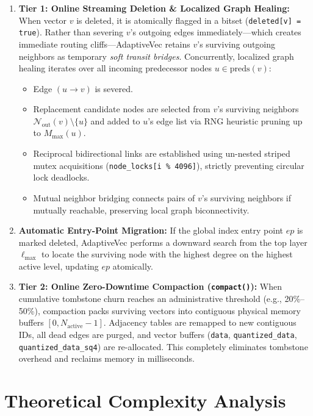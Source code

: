 \documentclass[conference,10pt]{IEEEtran}
\begin{document}
\begin{enumerate}
    \item \textbf{Tier 1: Online Streaming Deletion \& Localized Graph Healing:} When vector $v$ is deleted, it is atomically flagged in a bitset (\texttt{deleted[v] = true}). Rather than severing $v$'s outgoing edges immediately---which creates immediate routing cliffs---AdaptiveVec retains $v$'s surviving outgoing neighbors as temporary \textit{soft transit bridges}. Concurrently, localized graph healing iterates over all incoming predecessor nodes $u \in \text{preds}(v)$:
    \begin{itemize}
        \item Edge $(u \to v)$ is severed.
        \item Replacement candidate nodes are selected from $v$'s surviving neighbors $\mathcal{N}_{\text{out}}(v) \setminus \{u\}$ and added to $u$'s edge list via RNG heuristic pruning up to $M_{\max}(u)$.
        \item Reciprocal bidirectional links are established using un-nested striped mutex acquisitions (\texttt{node\_locks[i \% 4096]}), strictly preventing circular lock deadlocks.
        \item Mutual neighbor bridging connects pairs of $v$'s surviving neighbors if mutually reachable, preserving local graph biconnectivity.
    \end{itemize}
    \item \textbf{Automatic Entry-Point Migration:} If the global index entry point $ep$ is marked deleted, AdaptiveVec performs a downward search from the top layer $\ell_{\max}$ to locate the surviving node with the highest degree on the highest active level, updating $ep$ atomically.
    \item \textbf{Tier 2: Online Zero-Downtime Compaction (\texttt{compact()}):} When cumulative tombstone churn reaches an administrative threshold (e.g., 20\%--50\%), compaction packs surviving vectors into contiguous physical memory buffers $[0, N_{\text{active}}-1]$. Adjacency tables are remapped to new contiguous IDs, all dead edges are purged, and vector buffers (\texttt{data}, \texttt{quantized\_data}, \texttt{quantized\_data\_sq4}) are re-allocated. This completely eliminates tombstone overhead and reclaims memory in milliseconds.
\end{enumerate}

\section{Theoretical Complexity Analysis}
\end{document}
